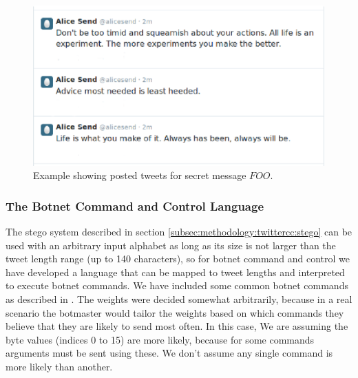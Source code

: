 \begin{figure}
\centering
\includegraphics[width=\columnwidth]{foo_test.eps}
\caption{Example showing posted tweets for secret message $FOO$.}
\label{fig:twitter-posts-foo}
\end{figure}

\subsubsection{The Botnet Command and Control Language}
\label{sec:methodology:botnet-cc-lang}

The stego system described in section \ref{subsec:methodology:twittercc:stego} can be
used with an arbitrary input alphabet as long as its size is not larger than the
tweet length range (up to 140 characters), so for botnet command and control we
have developed a language that can be mapped to tweet lengths and interpreted to
execute botnet commands.  We have included some common botnet commands as described
in \cite{twitter-botnet}.  The weights were decided somewhat arbitrarily, because
in a real scenario the botmaster would tailor the weights based on which
commands they believe that they are likely to send most often.  In this case,
We are assuming the byte values (indices 0 to 15) are more likely, because for
some commands arguments must be sent using these.  We don't assume any single
command is more likely than another.


